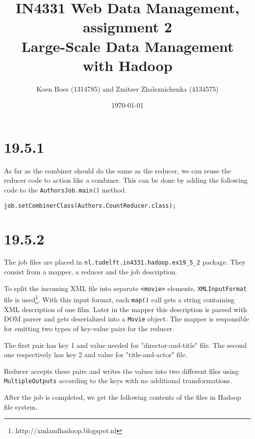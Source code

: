 \documentclass[a4paper, notitlepage]{article}
\begin{document}
\title{IN4331 Web Data Management, assignment 2 \\
Large-Scale Data Management with Hadoop}
\author{Koen Boes (1314785) and Zmitser Zhaleznichenka (4134575)}
\date{\today}
\maketitle

\setcounter{secnumdepth}{0}

\section{19.5.1}

As far as the combiner should do the same as the reducer, we can reuse the reducer code to action like a combiner. This can be done by adding the following code to the \lstinline{AuthorsJob.main()} method.

\begin{lstlisting}
job.setCombinerClass(Authors.CountReducer.class);  
\end{lstlisting}

\section{19.5.2}

The job files are placed in \lstinline{nl.tudelft.in4331.hadoop.ex19_5_2} package. They consist from a mapper, a reducer and the job description.

To split the incoming XML file into separate \lstinline{<movie>} elements, \lstinline{XMLInputFormat} file is used\footnote{http://xmlandhadoop.blogspot.nl}. With this input format, each \lstinline{map()} call gets a string containing XML description of one film. Later in the mapper this description is parsed with DOM parser and gets deserialized into a \lstinline{Movie} object. The mapper is responsible for emitting two types of key-value pairs for the reducer.

The first pair has key 1 and value needed for "director-and-title" file. The second one respectively has key 2 and value for "title-and-actor" file.

Reducer accepts these pairs and writes the values into two different files using \lstinline{MultipleOutputs} according to the keys with no additional transformations. 

After the job is completed, we get the following contents of the files in Hadoop file system.
\end{document}
